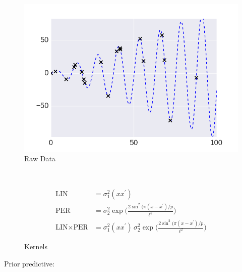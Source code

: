  \centering

     \begin{subfigure}[b]{0.45\textwidth}
        \includegraphics[width=\textwidth]{figs/composition/composition_demo_raw_data.png}
        \caption{Raw Data}
    \end{subfigure}
    ~ %
    \begin{subfigure}[b]{0.45\textwidth}
\small
     \begin{align*}
    \text{LIN} &=   \sigma_1^2(x x^\prime)\\
    \text{PER} &=  \sigma_2^2 \exp \bigg( \frac{2 \sin^2 ( \pi (x - x^\prime)/p}{\ell^2} \bigg)\\ 
    \text{LIN} \times \text{PER} &=  \sigma_1^2(x x^\prime)\, \sigma_2^2 \exp \bigg( \frac{2 \sin^2 ( \pi (x - x^\prime)/p}{\ell^2} \bigg) 
    \end{align*}\vspace{5mm} 
        \caption{Kernels}
    \end{subfigure}\vspace{4mm} 




Prior predictive:

